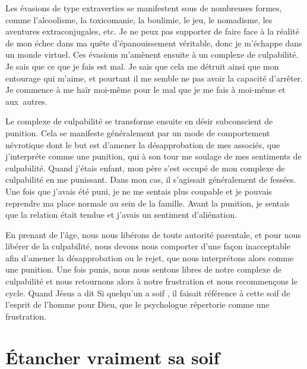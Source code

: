 Les évasions de type extraverties se manifestent sous de nombreuses formes,
 comme l'alcoolisme, la toxicomanie, la boulimie, le jeu, le nomadisme,
 les aventures extraconjugales, etc.
 Je ne peux pas supporter de faire face à la réalité de mon échec dans ma quête
 d'épanouissement véritable, donc je m'échappe dans un monde virtuel.
 Ces évasions m'amènent ensuite à un complexe de culpabilité.
 Je sais que ce que je fais est mal. Je sais que cela me détruit
 ainsi que mon entourage qui m'aime, et pourtant il me semble ne pas avoir
 la capacité d'arrêter. Je commence à me haïr moi-même pour le mal que je me fais
 à moi-même et aux~autres.

Le complexe de culpabilité se transforme ensuite en désir subconscient
 de punition. Cela se manifeste généralement par un mode de comportement
 névrotique dont le but est d'amener la désapprobation de mes associés,
 que j'interpréte comme une punition, qui à son tour me soulage
 de mes sentiments de culpabilité. Quand j'étais enfant, mon père
 s'est occupé de mon complexe de culpabilité en me punissant.
 Dans mon cas, il s'agissait généralement de fessées.
 Une fois que j'avais été puni, je ne me sentais plus coupable
 et je pouvais reprendre ma place normale au sein de la famille.
 Avant la punition, je sentais que la relation était tendue et j'avais
 un sentiment d'aliénation.

En prenant de l'âge, nous nous libérons de toute autorité parentale,
 et pour nous libérer de la culpabilité, nous devons
 nous comporter d'une façon inacceptable afin d'amener la désapprobation
 ou le rejet, que nous interprétons alors comme une punition.
 Une fois punis, nous nous sentons libres de notre complexe de culpabilité
 et nous retournons alors à notre frustration et nous recommençons le cycle.
 Quand Jésus a dit\frcolon{} \Og Si quelqu'un a soif \Fg{},
 il faisait référence à cette soif de l'esprit de l'homme pour Dieu,
 que le psychologue répertorie comme une frustration.
 \nowidow[6]


\section{\'Etancher vraiment sa soif}

